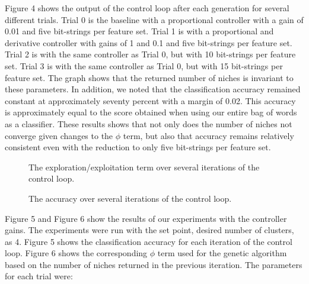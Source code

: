 \documentclass{sig-alternate}
\begin{document}
Figure 4 shows the output of the control loop after each generation for several different trials. Trial 0 is the baseline with a proportional controller with a gain of 0.01 and five bit-strings per feature set. Trial 1 is with a proportional and derivative controller with gains of 1 and 0.1 and five bit-strings per feature set. Trial 2 is with the same controller as Trial 0, but with 10 bit-strings per feature set. Trial 3 is with the same controller as Trial 0, but with 15 bit-strings per feature set. The graph shows that the returned number of niches is invariant to these parameters. In addition, we noted that the classification accuracy remained constant at approximately seventy percent with a margin of 0.02. This accuracy is approximately equal to the score obtained when using our entire bag of words as a classifier. These results shows that not only does the number of niches not converge given changes to the $\phi$ term, but also that accuracy remains relatively consistent even with the reduction to only five bit-strings per feature set.\\
\begin{figure}[t]
\centering
{}
\caption{The exploration/exploitation term over several iterations of the control loop.}
\label{fig:graph3}
\end{figure}
\begin{figure}[t]
\centering
{}
\caption{The accuracy over several iterations of the control loop.}
\label{fig:graph3}
\end{figure}
\indent Figure 5 and Figure 6 show the results of our experiments with the controller gains. The experiments were run with the set point, desired number of clusters, as 4. Figure 5 shows the classification accuracy for each iteration of the control loop. Figure 6 shows the corresponding $\phi$ term used for the genetic algorithm based on the number of niches returned in the previous iteration. The parameters for each trial were:
\end{document}
